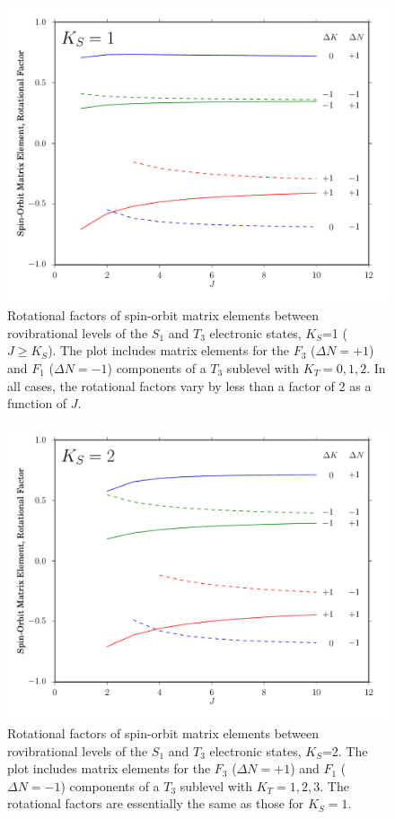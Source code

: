 \begin{figure}[p]
  \caption{Rotational factors of spin-orbit matrix elements between
    rovibrational levels of the $S_1$ and $T_3$ electronic states,
    $K_S$=1 ($J \ge K_S$).  The plot includes matrix elements for the
    $F_3$ ($\Delta N = +1$) and $F_1$ ($\Delta N = -1$) components of
    a $T_3$ sublevel with $K_T=0,1,2$.  In all cases, the rotational
    factors vary by less than a factor of 2 as a function of $J$.}
  \label{fig:rotational-factors-1}
  \centering
  \includegraphics[width=6in]{rotational-factors-k1.pdf}
\end{figure}

\begin{figure}[p]
  \caption{Rotational factors of spin-orbit matrix elements between
    rovibrational levels of the $S_1$ and $T_3$ electronic states,
    $K_S$=2.  The plot includes matrix elements for the $F_3$ ($\Delta
    N = +1$) and $F_1$ ($\Delta N = -1$) components of a $T_3$
    sublevel with $K_T=1,2,3$.  The rotational factors are essentially
    the same as those for $K_S=1$.}
  \label{fig:rotational-factors-2}
  \centering
  \includegraphics[width=6in]{rotational-factors-k2.pdf}
\end{figure}

